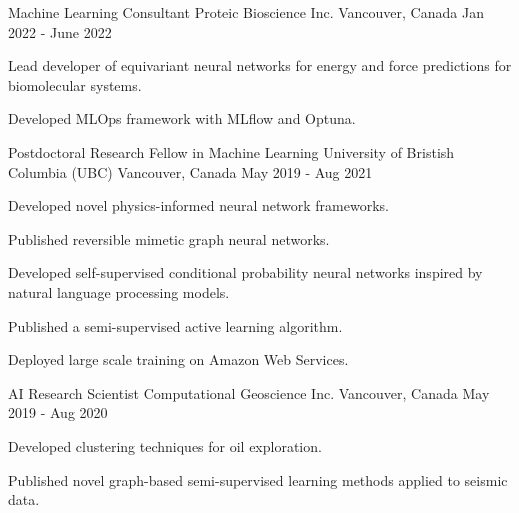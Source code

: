 

\begin{cventries}

  \cventry
    {Machine Learning Consultant} %
    {Proteic Bioscience Inc.} %
    {Vancouver, Canada} %
    {Jan 2022 - June 2022} %
    {
      \begin{cvitems} %
        \item {Lead developer of equivariant neural networks for energy and force predictions for biomolecular systems.}
        \item {Developed MLOps framework with MLflow and Optuna.}
      \end{cvitems}
    }

  \cventry
    {Postdoctoral Research Fellow in Machine Learning} %
    {University of Bristish Columbia (UBC)} %
    {Vancouver, Canada} %
    {May 2019 - Aug 2021} %
    {
      \begin{cvitems} %
        \item {Developed novel physics-informed neural network frameworks.}
        \item {Published reversible mimetic graph neural networks.}
        \item {Developed self-supervised conditional probability neural networks inspired by natural language processing models.}
        \item {Published a semi-supervised active learning algorithm.}
        \item {Deployed large scale training on Amazon Web Services.}
      \end{cvitems}
    }

  \cventry
    {AI Research Scientist} %
    {Computational Geoscience Inc.} %
    {Vancouver, Canada} %
    {May 2019 - Aug 2020} %
    {
      \begin{cvitems} %
        \item {Developed clustering techniques for oil exploration.}
        \item {Published novel graph-based semi-supervised learning methods applied to seismic data.}
      \end{cvitems}
    }


\end{cventries}
